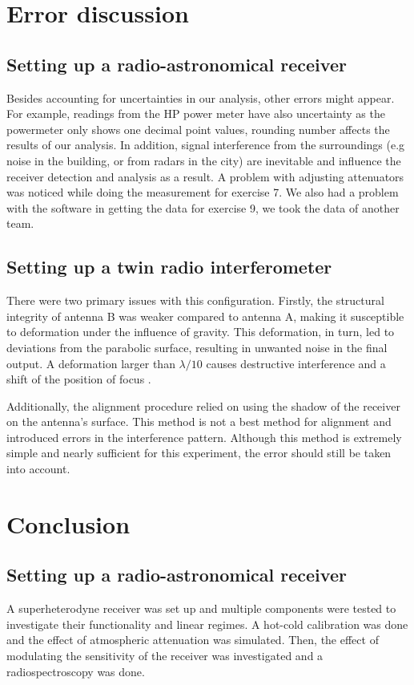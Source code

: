\documentclass[12pt]{article}
\begin{document}
\section{Error discussion}
\subsection{Setting up a radio-astronomical receiver}
Besides accounting for uncertainties in our analysis, other errors might appear. For example, readings from the HP power meter have also uncertainty as the powermeter only shows one decimal point values, rounding number affects the results of our analysis. In addition, signal interference from the surroundings (e.g noise in the building, or from radars in the city) are inevitable and influence the receiver detection and analysis as a result. A problem with adjusting attenuators was noticed while doing the measurement for exercise 7. We also had a problem with the software in getting the data for exercise 9, we took the data of another team. 

\subsection{Setting up a twin radio interferometer}
There were two primary issues with this configuration. Firstly, the structural integrity of antenna B was weaker compared to antenna A, making it susceptible to deformation under the influence of gravity. This deformation, in turn, led to deviations from the parabolic surface, resulting in unwanted noise in the final output. A deformation larger than $\lambda/10$ causes destructive interference and a shift of the position of focus \cite{klein}. 

Additionally, the alignment procedure relied on using the shadow of the receiver on the antenna's surface. This method is not a best method for alignment and introduced errors in the interference pattern. Although this method is extremely simple and nearly sufficient for this experiment, the error should still be taken into account.


\section{Conclusion}
\subsection{Setting up a radio-astronomical receiver}
A superheterodyne receiver was set up and multiple components were tested to investigate their functionality and linear regimes. A hot-cold calibration was done and the effect of atmospheric attenuation was simulated. Then, the effect of modulating the sensitivity of the receiver was investigated and a radiospectroscopy was done. 
\end{document}
